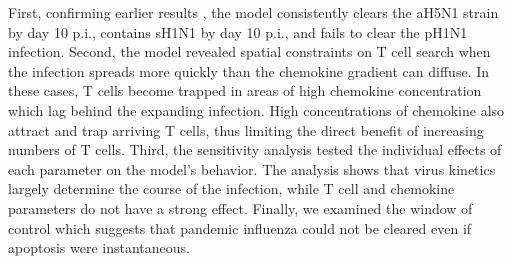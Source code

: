 \documentclass[10pt]{article}
\begin{document}
First, confirming earlier results \cite{Mitchell2011}, the model consistently clears the aH5N1 strain by day 10 p.i., contains sH1N1 by day 10 p.i., and fails to clear the pH1N1 infection.  Second, the model revealed spatial constraints on T cell search when the infection spreads more quickly than the chemokine gradient can diffuse.  In these cases, T cells become trapped in areas of high chemokine concentration which lag behind the expanding infection.  High concentrations of chemokine also attract and trap arriving T cells, thus limiting the direct benefit of increasing numbers of T cells. Third, the sensitivity analysis tested the individual effects of each parameter on the model's behavior.  The analysis shows that virus kinetics largely determine the course of the infection, while T cell and chemokine parameters do not have a strong effect.  Finally, we examined the window of control which suggests that pandemic influenza could not be cleared even if apoptosis were instantaneous.  





\end{document}

